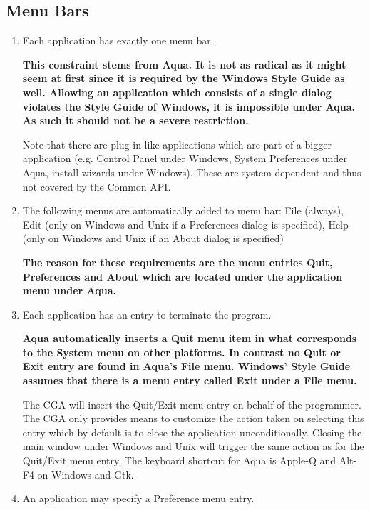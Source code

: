\documentclass{article}
\newcommand{\rationale}[1]{{\footnotesize\bf #1}}
\begin{document}
\subsection{Menu Bars}
\begin{enumerate}
\item Each application has exactly one menu bar.
  
  \rationale{ This constraint stems from Aqua. It is not as radical as
    it might seem at first since it is required by the Windows Style
    Guide as well. Allowing an application which consists of a single
    dialog violates the Style Guide of Windows, it is impossible under
    Aqua. As such it should not be a severe restriction. }
  
  Note that there are plug-in like applications which are part of a
  bigger application (e.g. Control Panel under Windows, System
  Preferences under Aqua, install wizards under Windows). These are
  system dependent and thus not covered by the Common API.

\item The following menus are automatically added to menu bar: File
  (always), Edit (only on Windows and Unix if a Preferences dialog is
  specified), Help (only on Windows and Unix if an About dialog is
  specified)

\rationale{ The reason for these requirements are the menu entries
  Quit, Preferences and About which are located under the application
  menu under Aqua. }

\item Each application has an entry to terminate the program.
  
  \rationale{ Aqua automatically inserts a Quit menu item in what
    corresponds to the System menu on other platforms. In contrast no
    Quit or Exit entry are found in Aqua's File menu. Windows' Style
    Guide assumes that there is a menu entry called Exit under a File
    menu.}

The CGA will insert the Quit/Exit menu entry on behalf of the
programmer.  The CGA only provides means to customize the action taken
on selecting this entry which by default is to close the application
unconditionally. Closing the main window under Windows and Unix will
trigger the same action as for the Quit/Exit menu entry. The keyboard
shortcut for Aqua is Apple-Q and Alt-F4 on Windows and Gtk.

\item An application may specify a Preference menu entry.
  

\end{enumerate}
\end{document}
